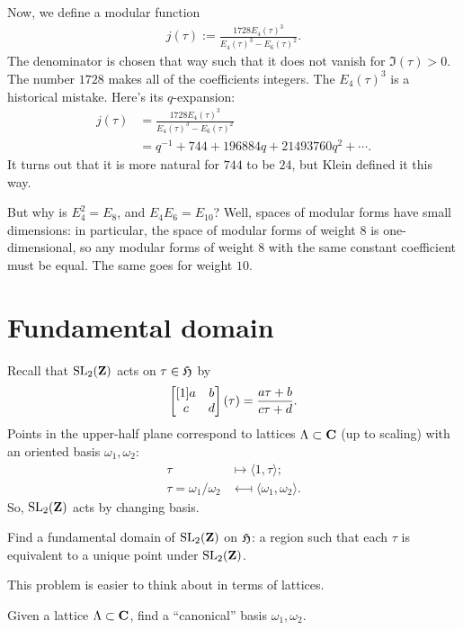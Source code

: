 \documentclass[11pt, oneside,margin=1in]{article}
\begin{document}
\begin{example}[ ]
Now, we define a modular function
 \begin{align*}
	j(\tau) :=  \frac{1728E_4(\tau)^3}{E_4(\tau)^3 -  E_6(\tau)^2}.
\end{align*}
The denominator is chosen that way such that it does not vanish for $\Im(\tau)>0$. The number $1728$ makes all of the coefficients integers. The $E_4(\tau)^3$ is a historical mistake. Here's its  $q$-expansion:
\begin{align*}
	j(\tau) &=  \frac{1728E_4(\tau)^3}{E_4(\tau)^3 -  E_6(\tau)^2}\\
		&= q^{-1} + 744 + 196884 q +21493760q^2+\cdots. 
\end{align*}
It turns out that it is more natural for $744$ to be $24$, but Klein defined it this way.

But why is $E_4^2 = E_8$, and $E_4E_6=E_{10}$? Well, spaces of modular forms have small dimensions: in particular, the space of modular forms of weight $8$ is one-dimensional, so any modular forms of weight $8$ with the same constant coefficient must be equal. The same goes for weight $10$.
\end{example}

\section{Fundamental domain}
Recall that $\operatorname{SL}_{2}(\mathbf Z)$ acts on $\tau \in \mathfrak H$ by
\begin{align*}
	\begin{bmatrix} [1] a&b\\c&d\end{bmatrix}(\tau) =  \frac{a\tau+b}{c\tau + d}.
\end{align*}
Points in the upper-half plane correspond to lattices $\Lambda\subset \mathbf C$ (up to scaling) with an oriented basis $\omega_1,\omega_2$: \begin{align*}
	\tau &\longmapsto \langle 1,\tau\rangle;\\
	\tau = \omega_1/\omega_2 &\longmapsfrom \langle \omega_1,\omega_2\rangle.
\end{align*}
So, $\operatorname{SL}_{2}(\mathbf Z)$ acts by changing basis.

\begin{problem}
	Find a fundamental domain of $\operatorname{SL}_{2}(\mathbf Z)$ on $\mathfrak H$: a region such that each $\tau$ is equivalent to a unique point under $\operatorname{SL}_{2}(\mathbf Z)$.
\end{problem}

This problem is easier to think about in terms of lattices.

\begin{problem}
	Given a lattice $\Lambda \subset \mathbf C$, find a ``canonical'' basis $\omega_1,\omega_2$.
\end{problem}
\end{document}
